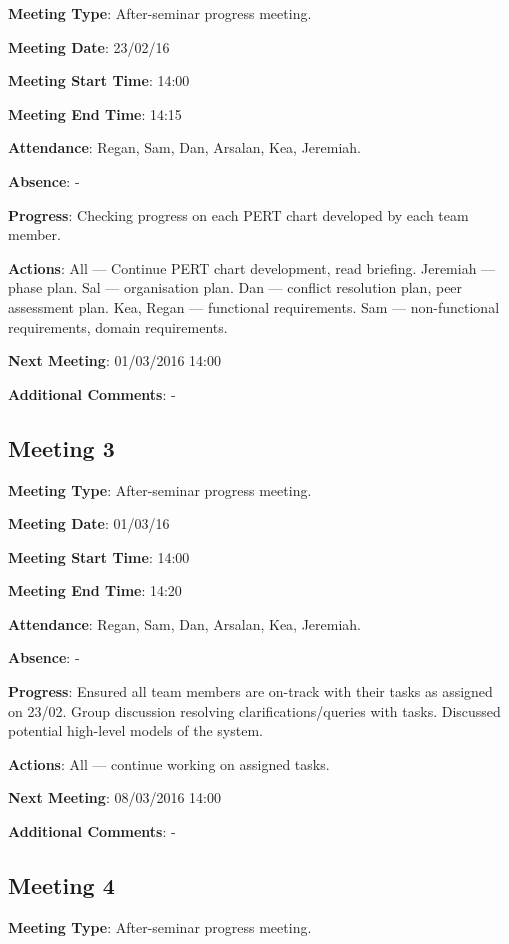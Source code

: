 \documentclass[11pt]{article}
\begin{document}
\textbf{Meeting Type}: After-seminar progress meeting.

\textbf{Meeting Date}: 23/02/16

\textbf{Meeting Start Time}: 14:00

\textbf{Meeting End Time}: 14:15

\textbf{Attendance}: Regan, Sam, Dan, Arsalan, Kea, Jeremiah.

\textbf{Absence}: -

\textbf{Progress}: Checking progress on each PERT chart developed by each team member.

\textbf{Actions}: All --- Continue PERT chart development, read briefing. Jeremiah --- phase plan. Sal --- organisation plan. Dan --- conflict resolution plan, peer assessment plan. Kea, Regan --- functional requirements. Sam --- non-functional requirements, domain requirements.

\textbf{Next Meeting}: 01/03/2016 14:00

\textbf{Additional Comments}: -

\subsection{Meeting 3}

\textbf{Meeting Type}: After-seminar progress meeting.

\textbf{Meeting Date}: 01/03/16

\textbf{Meeting Start Time}: 14:00

\textbf{Meeting End Time}: 14:20

\textbf{Attendance}: Regan, Sam, Dan, Arsalan, Kea, Jeremiah.

\textbf{Absence}: -

\textbf{Progress}: Ensured all team members are on-track with their tasks as assigned on 23/02. Group discussion resolving clarifications/queries with tasks. Discussed potential high-level models of the system.

\textbf{Actions}: All --- continue working on assigned tasks.

\textbf{Next Meeting}: 08/03/2016 14:00

\textbf{Additional Comments}: -

\subsection{Meeting 4}

\textbf{Meeting Type}: After-seminar progress meeting.
\end{document}
